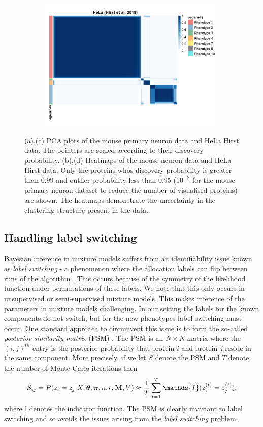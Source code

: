 \documentclass[12pt,english]{article}
\begin{document}
\begin{figure}
\begin{subfigure}[t]{0.5\textwidth}
	\centering
	\includegraphics[height=2.5in]{heatmapHirst.jpeg}
	\caption{}
\end{subfigure}
	\caption{(a),(c) PCA plots of the mouse primary neuron data and HeLa Hirst data. The pointers are scaled according to their discovery probability. (b),(d) Heatmaps of the mouse neuron data and HeLa Hirst data. Only the proteins whos discovery probability is greater than $0.99$ and outlier probability less than $0.95$ ($10^{-2}$ for the mouse primary neuron dataset to reduce the number of visualised proteins) are shown. The heatmaps demonstrate the uncertainty in the clustering structure present in the data.}
\end{figure}




\subsection{Handling label switching}
Bayesian inference in mixture models suffers from an identifiability issue known as \textit{label switching} - a phenomenon where the allocation labels can flip between runs of the algorithm \citep{Richardson::1997, Stephens:2000}. This occurs because of the symmetry of the likelihood function under permutations of these labels. We note that this only occurs in unsupervised or semi-supervised mixture models. This makes inference of the parameters in mixture models challenging. In our setting the labels for the known components do not switch, but for the new phenotypes label switching must occur. One standard approach to circumvent this issue is to form the so-called \textit{posterior similarity matrix} (PSM) \citep{fritsch::2009}. The PSM is an $N\times N$ matrix where the $(i,j)^{th}$ entry is the posterior probability that protein $i$ and protein $j$ reside in the same component. More precisely, if we let $S$ denote the PSM and $T$ denote the number of Monte-Carlo iterations then 
\begin{equation}
S_{ij} = P(z_i = z_j| X, \boldsymbol{\theta}, \boldsymbol{\pi} , \kappa, \epsilon, {\bf M}, V) \approx \frac{1}{T} \sum_{t = 1}^{T} \mathds{I}(z^{(t)}_i = z^{(t)}_j),
\end{equation}
where $\mathds{I}$ denotes the indicator function. The PSM is clearly invariant to label switching and so avoids the issues arising from the \textit{label switching} problem. 
\end{document}
